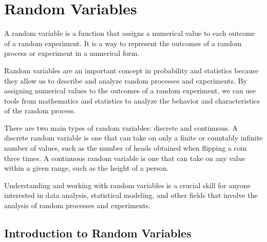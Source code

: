 \documentclass{report}
\begin{document}
    \chapter{Random Variables}

    A random variable is a function that assigns a numerical value to each outcome of a random experiment. It is a way to represent the outcomes of a random process or experiment in a numerical form.

    Random variables are an important concept in probability and statistics because they allow us to describe and analyze random processes and experiments. By assigning numerical values to the outcomes of a random experiment, we can use tools from mathematics and statistics to analyze the behavior and characteristics of the random process.

    There are two main types of random variables: discrete and continuous. A discrete random variable is one that can take on only a finite or countably infinite number of values, such as the number of heads obtained when flipping a coin three times. A continuous random variable is one that can take on any value within a given range, such as the height of a person.

    Understanding and working with random variables is a crucial skill for anyone interested in data analysis, statistical modeling, and other fields that involve the analysis of random processes and experiments.

    \section{Introduction to Random Variables}



\end{document}
